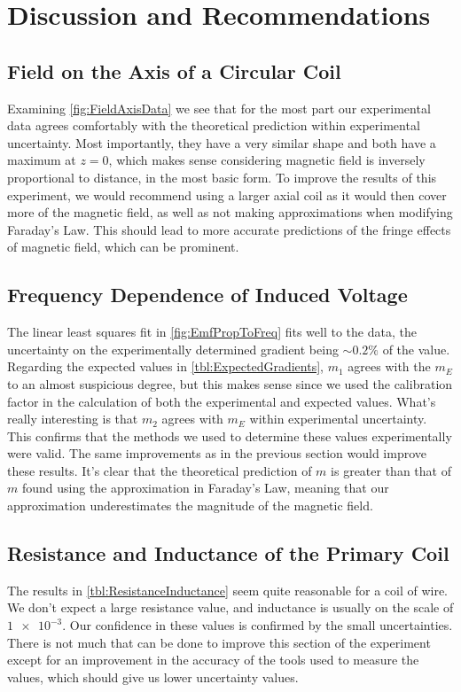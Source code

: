 \documentclass[12pt]{article}
\numberwithin{equation}{section}
\numberwithin{figure}{section}
\numberwithin{table}{section}
\begin{document}
    \section{Discussion and Recommendations}
    \subsection{Field on the Axis of a Circular Coil}
    Examining \autoref{fig:FieldAxisData} we see that for the most part our experimental data 
    agrees comfortably with the theoretical prediction within experimental uncertainty. Most 
    importantly, they have a very similar shape and both have a maximum at $z=0$, which 
    makes sense considering magnetic field is inversely proportional to distance, in the most 
    basic form. \newline
    To improve the results of this experiment, we would recommend using a larger axial coil 
    as it would then cover more of the magnetic field, as well as not making approximations 
    when modifying Faraday's Law. This should lead to more accurate predictions of the fringe 
    effects of magnetic field, which can be prominent.

    \subsection{Frequency Dependence of Induced Voltage}
    The linear least squares fit in \autoref{fig:EmfPropToFreq} fits well to the data, the 
    uncertainty on the experimentally determined gradient being $\sim 0.2\%$ of the value. 
    Regarding the expected values in \autoref{tbl:ExpectedGradients}, $m_1$ agrees with 
    the $m_E$ to an almost suspicious degree, but this makes sense since we 
    used the calibration factor in the calculation of both the experimental and expected 
    values. What's really interesting is that $m_2$ agrees with $m_E$ within experimental 
    uncertainty. This confirms that the methods we used to determine these values experimentally 
    were valid. \newline
    The same improvements as in the previous section would improve these results. It's clear 
    that the theoretical prediction of $m$ is greater than that of $m$ found using the 
    approximation in Faraday's Law, meaning that our approximation underestimates the 
    magnitude of the magnetic field. 

    \subsection{Resistance and Inductance of the Primary Coil}
    The results in \autoref{tbl:ResistanceInductance} seem quite reasonable for a coil of wire. 
    We don't expect a large resistance value, and inductance is usually on the scale of 
    $\num{1e-3}$. Our confidence in these values is confirmed by the small uncertainties. \newline
    There is not much that can be done to improve this section of the experiment except for an 
    improvement in the accuracy of the tools used to measure the values, which should give us 
    lower uncertainty values.
\end{document}
